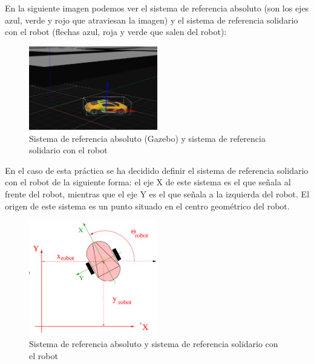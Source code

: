 En la siguiente imagen podemos ver el sistema de referencia absoluto (son los ejes azul, verde y rojo que atraviesan la imagen) y el sistema de referencia solidario con el robot (flechas azul, roja y verde que salen del robot):

\begin{figure}[H]
  \begin{center}
    \includegraphics[width=0.5\textwidth]{figures/GPP/sistemaReferencia_GPP.png}
		\caption{Sistema de referencia absoluto (Gazebo) y sistema de referencia solidario con el robot}
		\label{fig.sistemaReferencia_gpp}
		\end{center}
\end{figure}

En el caso de esta práctica se ha decidido definir el sistema de referencia solidario con el robot de la siguiente forma: el eje X de este sistema es el que señala al frente del robot, mientras que el eje Y es el que señala a la izquierda del robot. El origen de este sistema es un punto situado en el centro geométrico del robot.

\begin{figure}[H]
  \begin{center}
    \includegraphics[width=0.5\textwidth]{figures/GPP/sistemasReferencia.png}
		\caption{Sistema de referencia absoluto y sistema de referencia solidario con el robot}
		\label{fig.sistemasReferencia_gpp}
		\end{center}
\end{figure}

